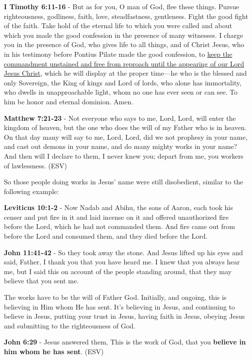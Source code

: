 \documentclass[11pt]{article}
\begin{document}
\textbf{I Timothy 6:11-16} - But as for you, O man of God, flee these things. Pursue righteousness, godliness, faith, love, steadfastness, gentleness.  Fight the good fight of the faith. Take hold of the eternal life to which you were called and about which you made the good confession in the presence of many witnesses.  I charge you in the presence of God, who gives life to all things, and of Christ Jesus, who in his testimony before Pontius Pilate made the good confession, to \uline{keep the commandment unstained and free from reproach until the appearing of our Lord Jesus Christ}, which he will display at the proper time—he who is the blessed and only Sovereign, the King of kings and Lord of lords, who alone has immortality, who dwells in unapproachable light, whom no one has ever seen or can see. To him be honor and eternal dominion. Amen.

\textbf{Matthew 7:21-23} - Not everyone who says to me, Lord, Lord, will enter the kingdom of heaven, but the one who does the will of my Father who is in heaven. On that day many will say to me, Lord, Lord, did we not prophesy in your name, and cast out demons in your name, and do many mighty works in your name? And then will I declare to them, I never knew you; depart from me, you workers of lawlessness. (ESV)

So those people doing works in Jesus' name were still disobedient, similar to the following example:

\textbf{Leviticus 10:1-2} - Now Nadab and Abihu, the sons of Aaron, each took his censer and put fire in it and laid incense on it and offered unauthorized fire before the Lord, which he had not commanded them. And fire came out from before the Lord and consumed them, and they died before the Lord.


\textbf{John 11:41-42} - So they took away the stone. And Jesus lifted up his eyes and said, Father, I thank you that you have heard me. I knew that you always hear me, but I said this on account of the people standing around, that they may believe that you sent me.

The works have to be the will of Father God. Initially, and ongoing, this is believing in Him whom He has sent. It's believing in Jesus, and continuing to believe in Jesus, putting your trust in Jesus, having faith in Jesus, obeying Jesus and submitting to the righteousness of God.

\textbf{John 6:29} - Jesus answered them, This is the work of God, that you \textbf{believe in him whom he has sent}. (ESV)
\end{document}
